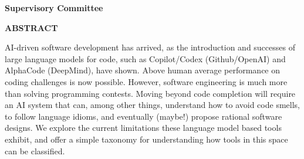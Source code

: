 \newpage
{}

\noindent \textbf{Supervisory Committee}
\tpbreak
\panel

\begin{center}
\textbf{ABSTRACT}
\end{center}
AI-driven software development has arrived, as the introduction and successes of large language models for code, such as Copilot/Codex (Github/OpenAI) and AlphaCode (DeepMind), have shown. Above human average performance on coding challenges is now possible. However, software engineering is much more than solving programming contests. Moving beyond code completion will require an AI system that can, among other things, understand how to avoid code smells, to follow language idioms, and eventually (maybe!) propose rational software designs. We explore the current limitations these language model based tools exhibit, and offer a simple taxonomy for understanding how tools in this space can be classified.